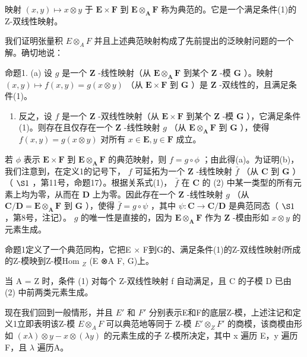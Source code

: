 映射 \((x,y)\mapsto x\otimes y\) 于 \(\mathbf{E}\times \mathbf{F}\) 到 \(\mathbf{E}\otimes_{\mathbf{A}}\mathbf{F}\) 称为典范的。它是一个满足条件(1)的Z-双线性映射。

我们证明张量积 \(E \otimes_{A} F\) 并且上述典范映射构成了先前提出的泛映射问题的一个解。确切地说：

命题1. (a) 设 \(g\) 是一个 \(\mathbf{Z}\) -线性映射（从 \(\mathbf{E} \otimes_{\mathbf{A}} \mathbf{F}\) 到某个 \(\mathbf{Z}\) -模 \(\mathbf{G}\) ）。映射 \((x, y) \mapsto f(x, y) = g(x \otimes y)\) （从 \(\mathbf{E} \times \mathbf{F}\) 到 \(\mathbf{G}\) ）是 \(\mathbf{Z}\) -双线性的，且满足条件(1)。

\begin{enumerate}
\def\labelenumi{(\alph{enumi})}
\setcounter{enumi}{1}
\tightlist
\item
  反之，设 \(f\) 是一个 \(\mathbf{Z}\) -双线性映射（从 \(\mathbf{E} \times \mathbf{F}\) 到某个 \(\mathbf{Z}\) -模 \(\mathbf{G}\) ），它满足条件(1)。则存在且仅存在一个 \(\mathbf{Z}\) -线性映射 \(g\) （从 \(\mathbf{E} \otimes_{\mathbf{A}} \mathbf{F}\) 到 \(\mathbf{G}\) ），使得 \(f(x,y) = g(x \otimes y)\) 对所有 \(x \in \mathbf{E}, y \in \mathbf{F}\) 成立。
\end{enumerate}

若 \(\phi\) 表示 \(\mathbf{E} \times \mathbf{F}\) 到 \(\mathbf{E} \otimes_{\mathbf{A}} \mathbf{F}\) 的典范映射，则 \(f = g \circ \phi\) ；由此得(a)。为证明(b)，我们注意到，在定义1的记号下， \(f\) 可延拓为一个 \(\mathbf{Z}\) -线性映射 \(\bar{f}\) （从 \(\mathbf{C}\) 到 \(\mathbf{G}\) ）（ \(\S 1\) ，第11号，命题17）。根据关系式(1)， \(\bar{f}\) 在 \(\mathbf{C}\) 的 (2) 中某一类型的所有元素上均为零，从而在 \(\mathbf{D}\) 上为零。因此存在一个 \(\mathbf{Z}\) -线性映射 \(g\) （从 \(\mathbf{C} / \mathbf{D} = \mathbf{E} \otimes_{\mathbf{A}} \mathbf{F}\) 到 \(\mathbf{G}\) ），使得 \(\bar{f} = g \circ \psi\) ，其中 \(\psi: \mathbf{C} \to \mathbf{C} / \mathbf{D}\) 是典范同态（ \(\S 1\) ，第8号，注记）。 \(g\) 的唯一性是直接的，因为 \(\mathbf{E} \otimes_{\mathbf{A}} \mathbf{F}\) 作为 \(\mathbf{Z}\) -模由形如 \(x \otimes y\) 的元素生成。

命题1定义了一个典范同构，它把E × F到G的、满足条件(1)的Z-双线性映射f所成的Z-模映到Z-模Hom \(_{Z}\) (E ⊗A F, G)上。

当 A = Z 时，条件 (1) 对每个 Z-双线性映射 f 自动满足，且 C 的子模 D 已由 (2) 中前两类元素生成。

现在我们回到一般情形，并且 \(E'\) 和 \(F'\) 分别表示E和F的底层Z-模，上述注记和定义1立即表明该Z-模 \(E \otimes_{A} F\) 可以典范地等同于 Z-模 \(E' \otimes_{Z} F'\) 的商模，该商模由形如 \((x\lambda) \otimes y - x \otimes (\lambda y)\) 的元素生成的子 Z-模所决定，其中 x 遍历 E，y 遍历 F，且 \(\lambda\) 遍历A。

